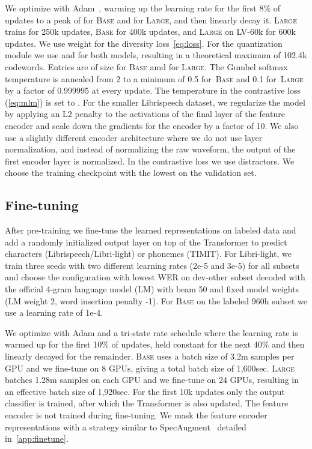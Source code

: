 \documentclass{article}
\newcommand{\wvppbase}{\textsc{Base}}
\newcommand{\wvppbig}{\textsc{Large}}
\newcommand{\libri}{Librispeech}
\newcommand{\libril}{Libri-light}
\newcommand{\voxsz}{LV-60k}
\begin{document}
We optimize with Adam~\citep{kingma2015adam}, warming up the learning rate for the first 8\% of updates to a peak of  for \wvppbase{} and  for \wvppbig{}, and then linearly decay it. 
\wvppbig{} trains for 250k updates, \wvppbase{} for 400k updates, and \wvppbig{} on \voxsz{} for 600k updates.
We use weight  for the diversity loss~\autoref{eq:loss}.
For the quantization module we use  and  for both models, resulting in a theoretical maximum of 102.4k codewords. 
Entries are of size  for \wvppbase{} amd  for \wvppbig{}.
The Gumbel softmax temperature  is annealed from 2 to a minimum of 0.5 for~\wvppbase{} and 0.1 for~\wvppbig{} by a factor of 0.999995 at every update. 
The temperature in the contrastive loss (\autoref{eq:mlm}) is set to .
For the smaller Librispeech dataset, we regularize the model by applying an L2 penalty to the activations of the final layer of the feature encoder and scale down the gradients for the encoder by a factor of 10. 
We also use a slightly different encoder architecture where we do not use layer normalization, and instead of normalizing the raw waveform, the output of the first encoder layer is normalized.
In the contrastive loss we use  distractors.
We choose the training checkpoint with the lowest  on the validation set.


\subsection{Fine-tuning}
\label{sec:setup-finetune}

After pre-training we fine-tune the learned representations on labeled data and add a randomly initialized output layer on top of the Transformer to predict characters (\libri{}/\libril{}) or phonemes (TIMIT).
For \libril{}, we train three seeds with two different learning rates (2e-5 and 3e-5) for all subsets and choose the configuration with lowest WER on dev-other subset decoded with the official 4-gram language model (LM) with beam 50 and fixed model weights (LM weight 2, word insertion penalty -1). 
For \wvppbase{} on the labeled 960h subset we use a learning rate of 1e-4.

We optimize with Adam and a tri-state rate schedule where the learning rate is warmed up for the first 10\% of updates, held constant for the next 40\% and then linearly decayed for the remainder. 
\wvppbase{} uses a batch size of 3.2m samples per GPU and we fine-tune on 8 GPUs, giving a total batch size of 1,600sec. 
\wvppbig{} batches 1.28m samples on each GPU and we fine-tune on 24 GPUs, resulting in an effective batch size of 1,920sec.
For the first 10k updates only the output classifier is trained, after which the Transformer is also updated. 
The feature encoder is not trained during fine-tuning. 
We mask the feature encoder representations with a strategy similar to SpecAugment~\citep{park2019specaugment} detailed in~\autoref{app:finetune}.
\end{document}
